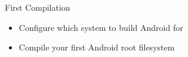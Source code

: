 \setuplabframe
{First Compilation}
{
  \begin{itemize}
  \item Configure which system to build Android for
  \item Compile your first Android root filesystem
  \end{itemize}
}